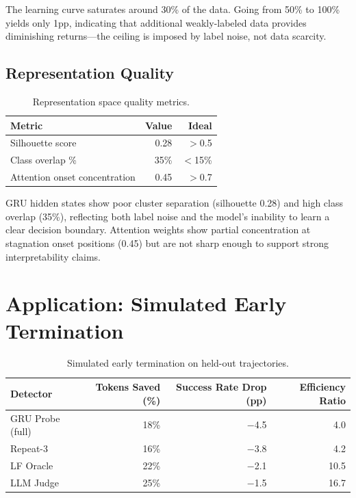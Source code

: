 \documentclass[11pt]{article}
\begin{document}
The learning curve saturates around 30\% of the data.
Going from 50\% to 100\% yields only 1pp, indicating that additional weakly-labeled data provides diminishing returns---the ceiling is imposed by label noise, not data scarcity.

\subsection{Representation Quality}
\label{sec:repr}

\begin{table}[h]
\centering
\caption{Representation space quality metrics.}
\label{tab:repr_quality}
\begin{tabular}{lrr}
\toprule
\textbf{Metric} & \textbf{Value} & \textbf{Ideal} \\
\midrule
Silhouette score & 0.28 & $>$0.5 \\
Class overlap \% & 35\% & $<$15\% \\
Attention onset concentration & 0.45 & $>$0.7 \\
\bottomrule
\end{tabular}
\end{table}

GRU hidden states show poor cluster separation (silhouette 0.28) and high class overlap (35\%), reflecting both label noise and the model's inability to learn a clear decision boundary.
Attention weights show partial concentration at stagnation onset positions (0.45) but are not sharp enough to support strong interpretability claims.

\section{Application: Simulated Early Termination}
\label{sec:application}

\begin{table}[h]
\centering
\caption{Simulated early termination on held-out trajectories.}
\label{tab:early_term}
\begin{tabular}{lrrr}
\toprule
\textbf{Detector} & \textbf{Tokens Saved (\%)} & \textbf{Success Rate Drop (pp)} & \textbf{Efficiency Ratio} \\
\midrule
GRU Probe (full) & 18\% & $-$4.5 & 4.0 \\
Repeat-3 & 16\% & $-$3.8 & 4.2 \\
LF Oracle & 22\% & $-$2.1 & 10.5 \\
LLM Judge & 25\% & $-$1.5 & 16.7 \\
\bottomrule
\end{tabular}
\end{table}
\end{document}
